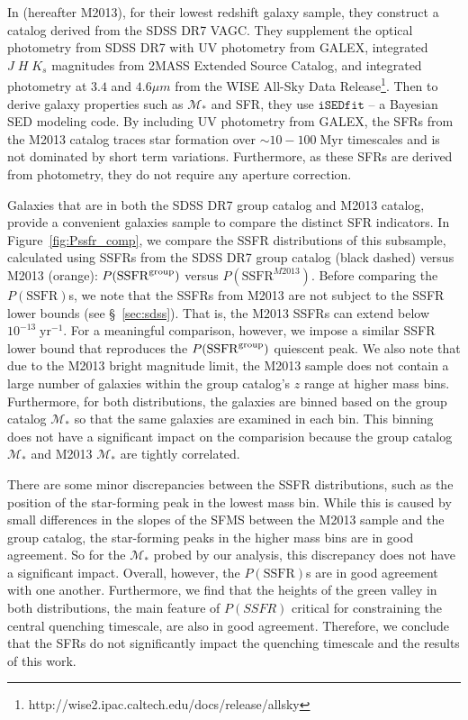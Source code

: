 \documentclass[iop,apj,tighten,twocolappendix,numberedappendix]{emulateapj}
\begin{document}
In \cite{Moustakas:2013aa} (hereafter M2013), for their lowest redshift galaxy 
sample, they construct a catalog derived from the SDSS DR7 VAGC. 
They supplement the optical photometry from SDSS DR7 with 
UV photometry from GALEX, integrated $J\;H\;K_s$ magnitudes 
from 2MASS Extended Source Catalog, and integrated photometry 
at $3.4$ and $4.6\mu m$ from the WISE All-Sky Data Release\footnote{http://wise2.ipac.caltech.edu/docs/release/allsky}.
Then to derive galaxy properties such as $\mathcal{M}_*$ and
SFR, they use $\mathtt{iSEDfit}$ -- a Bayesian SED modeling code. 
By including UV photometry from GALEX, the SFRs from the 
M2013 catalog traces star formation over 
$\sim 10 - 100\;\mathrm{Myr}$ timescales and is not dominated
by short term variations. Furthermore, as these SFRs are 
derived from photometry, they do not require any aperture 
correction. 

Galaxies that are in both the SDSS DR7 group catalog and 
M2013 catalog, provide a convenient galaxies sample
to compare the distinct SFR indicators. In Figure~\ref{fig:Pssfr_comp}, 
we compare the SSFR distributions of this subsample, 
calculated using SSFRs from the SDSS DR7 group catalog (black dashed) 
versus M2013 (orange): $P(\mathrm{SSFR}^{\rm group})$ versus 
$P(\mathrm{SSFR}^{M2013})$. Before comparing the 
$P(\mathrm{SSFR})$s, we note that the SSFRs from M2013 are 
not subject to the \cite{Brinchmann:2004aa} SSFR lower bounds
(see \S~\ref{sec:sdss}). That is, the M2013 SSFRs can extend
below $10^{-13}\;\mathrm{yr}^{-1}$. For a meaningful comparison, 
however, we impose a similar SSFR lower bound that reproduces 
the $P(\mathrm{SSFR}^{\rm group})$ quiescent peak. We also note 
that due to the M2013 bright magnitude limit, the M2013 sample 
does not contain a large number of galaxies within the group 
catalog's $z$ range at higher mass bins. Furthermore, for
both distributions, the galaxies are binned based on the
group catalog $\mathcal{M}_*$ so that the same galaxies are
examined in each bin. This binning does not have a significant
impact on the comparision because the group catalog $\mathcal{M}_*$ 
and M2013 $\mathcal{M}_*$ are tightly correlated. 

There are some minor discrepancies between the SSFR distributions, 
such as the position of the star-forming peak in the lowest mass 
bin. While this is caused by small
differences in the slopes of the SFMS between the M2013 sample 
and the group catalog, the star-forming peaks in the higher mass bins are 
in good agreement. So for the $\mathcal{M}_*$ probed by our analysis, 
this discrepancy does not have a significant impact. Overall, however, 
the $P(\mathrm{SSFR})$s are in good agreement with one another. 
Furthermore, we find that the heights of the green valley in both 
distributions, the main feature of $P(SSFR)$ critical for 
constraining the central quenching timescale, are also in good 
agreement. Therefore, we conclude that the \cite{Brinchmann:2004aa} SFRs
do not significantly impact the quenching timescale and the results of
this work. 
\end{document}
